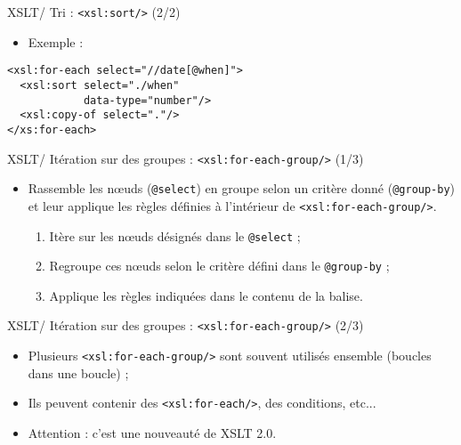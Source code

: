 \documentclass{beamer}
\begin{document}
    \begin{frame}[fragile]{XSLT/ Tri : \texttt{<xsl:sort/>} (2/2)}
        \Large
        \begin{itemize}
            \item Exemple :
        \end{itemize}
        \begin{verbatim}
<xsl:for-each select="//date[@when]">
  <xsl:sort select="./when" 
            data-type="number"/>
  <xsl:copy-of select="."/>
</xs:for-each>
        \end{verbatim}
    \end{frame}

    \begin{frame}{XSLT/ Itération sur des groupes : \texttt{<xsl:for-each-group/>} (1/3)}
        \Large
        \begin{itemize}
            \item Rassemble les n\oe uds (\texttt{@select}) en groupe selon un critère donné (\texttt{@group-by}) et leur applique les règles définies à l'intérieur de \texttt{<xsl:for-each-group/>}.
            \bigskip
            \begin{enumerate}
            \Large
                \item Itère sur les n\oe uds désignés dans le \texttt{@select} ;
                \item Regroupe ces n\oe uds selon le critère défini dans le \texttt{@group-by} ;
                \item Applique les règles indiquées dans le contenu de la balise.
            \end{enumerate}
        \end{itemize}
    \end{frame}

    \begin{frame}{XSLT/ Itération sur des groupes : \texttt{<xsl:for-each-group/>} (2/3)}
        \Large
        \begin{itemize}
            \item Plusieurs \texttt{<xsl:for-each-group/>} sont souvent utilisés ensemble (boucles dans une boucle) ;
            \bigskip
            \item Ils peuvent contenir des \texttt{<xsl:for-each/>}, des conditions, etc...
            \bigskip
            \item Attention : c'est une nouveauté de XSLT 2.0.
        \end{itemize}
    \end{frame}
\end{document}
